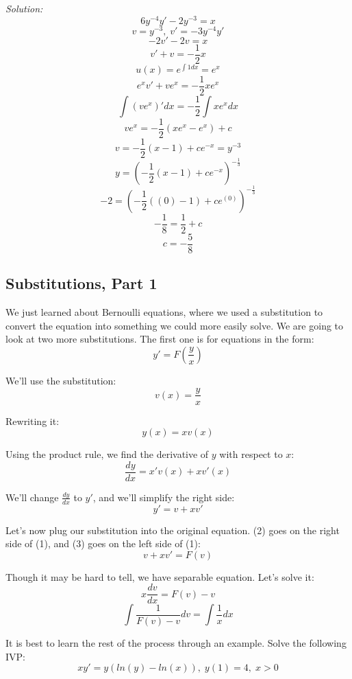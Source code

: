 	\textit{Solution:}
	$$6y^{-4}y' - 2y^{-3} = x$$
	$$v = y^{-3},\;v' = -3y^{-4}y'$$
	$$-2v' - 2v = x$$
	$$v' + v = -\frac{1}{2}x$$
	$$u(x) = e^{\int 1dx} = e^{x}$$
	$$e^{x}v' + ve^{x} = -\frac{1}{2}xe^{x}$$
	$$\int (ve^{x})'dx = -\frac{1}{2}\int xe^{x}dx$$
	$$ve^{x} = -\frac{1}{2}(xe^{x} - e^{x}) + c$$
	$$v = -\frac{1}{2}(x - 1) + ce^{-x} = y^{-3}$$
	$$y = \left(-\frac{1}{2}(x - 1) + ce^{-x}\right)^{-\frac{1}{3}}$$
	$$-2 = \left(-\frac{1}{2}((0) - 1) + ce^{(0)}\right)^{-\frac{1}{3}}$$
	$$-\frac{1}{8} = \frac{1}{2} + c$$
	$$c = -\frac{5}{8}$$
	\begin{center}
	\end{center}
	
	\subsection{Substitutions, Part 1}
	We just learned about Bernoulli equations, where we used a substitution to convert the equation into something we could more easily solve. We are going to look at two more substitutions. The first one is for equations in the form:
	\begin{equation}
		y' = F\left(\frac{y}{x}\right)
	\end{equation}
	
	We'll use the substitution:
	\begin{equation}
		v(x) = \frac{y}{x}
	\end{equation}
	
	Rewriting it:
	$$y(x) = xv(x)$$
	
	Using the product rule, we find the derivative of $y$ with respect to $x$:
	$$\frac{dy}{dx} = x'v(x) + xv'(x)$$
	
	We'll change $\frac{dy}{dx}$ to $y'$, and we'll simplify the right side:
	\begin{equation}
		y' = v + xv'
	\end{equation}
	
	Let's now plug our substitution into the original equation. (2) goes on the right side of (1), and (3) goes on the left side of (1):
	$$v + xv' = F(v)$$
	
	Though it may be hard to tell, we have separable equation. Let's solve it:
	$$x\frac{dv}{dx} = F(v) - v$$
	$$\int \frac{1}{F(v) - v}dv = \int \frac{1}{x}dx$$
	
	It is best to learn the rest of the process through an example. Solve the following IVP:
	$$xy' = y(ln(y) - ln(x)),\;y(1) = 4,\;x > 0$$
	
